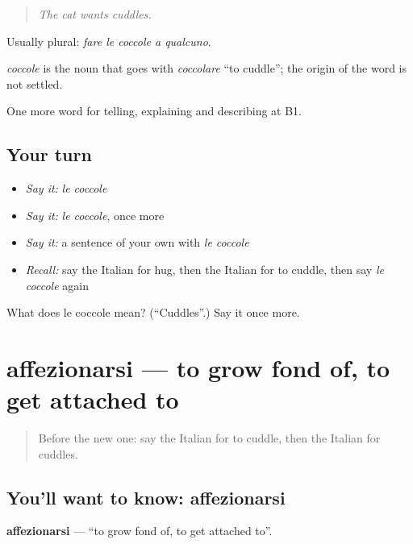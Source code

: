 \begin{quote}
\emph{The cat wants cuddles.}
\end{quote}

Usually plural: \emph{fare le coccole a qualcuno}.

\begin{cousinweb}
\emph{coccole} is the noun that goes with \emph{coccolare} \textquotedblleft{}to cuddle\textquotedblright{}; the origin of the word is not settled.
\end{cousinweb}

\begin{grammarlens}[title={What you've built}]
One more word for telling, explaining and describing at B1.
\end{grammarlens}

\subsection*{Your turn}
\begin{itemize}
\raggedright
  \item \emph{Say it:} \emph{le coccole}
  \item \emph{Say it:} \emph{le coccole}, once more
  \item \emph{Say it:} a sentence of your own with \emph{le coccole}
  \item \emph{Recall:} say the Italian for hug, then the Italian for to cuddle, then say \emph{le coccole} again
\end{itemize}

\begin{tcolorbox}[breakable,colback=teal!4,colframe=teal!35!black,title={Before you move on}]
What does le coccole mean? (\textquotedblleft{}Cuddles\textquotedblright{}.) Say it once more.
\end{tcolorbox}
\section[affezionarsi]{affezionarsi — to grow fond of, to get attached to}

\label{lesson:IT-C492-affezionarsi}



\begin{quote}
Before the new one: say the Italian for to cuddle, then the Italian for cuddles.
\end{quote}

\subsection*{You'll want to know: affezionarsi}
\textbf{affezionarsi} — \textquotedblleft{}to grow fond of, to get attached to\textquotedblright{}.


